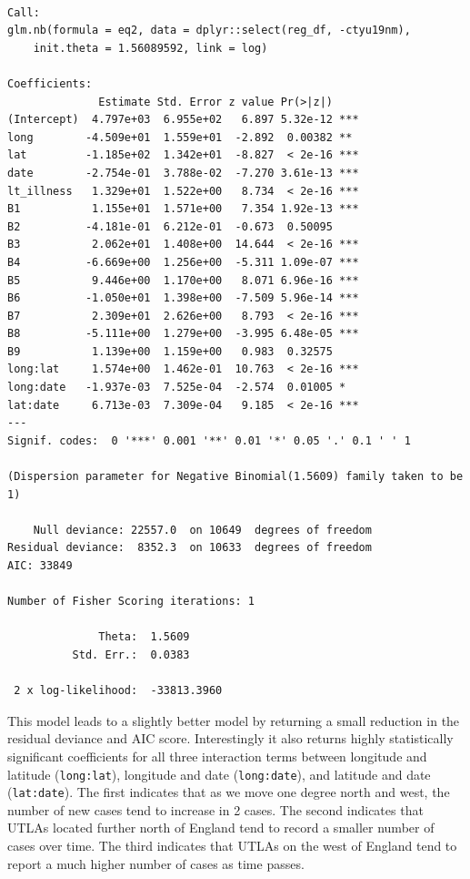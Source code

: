 \documentclass[
  letterpaper,
  DIV=11,
  numbers=noendperiod,
  oneside]{scrreprt}
\begin{document}
\begin{verbatim}

Call:
glm.nb(formula = eq2, data = dplyr::select(reg_df, -ctyu19nm), 
    init.theta = 1.56089592, link = log)

Coefficients:
              Estimate Std. Error z value Pr(>|z|)    
(Intercept)  4.797e+03  6.955e+02   6.897 5.32e-12 ***
long        -4.509e+01  1.559e+01  -2.892  0.00382 ** 
lat         -1.185e+02  1.342e+01  -8.827  < 2e-16 ***
date        -2.754e-01  3.788e-02  -7.270 3.61e-13 ***
lt_illness   1.329e+01  1.522e+00   8.734  < 2e-16 ***
B1           1.155e+01  1.571e+00   7.354 1.92e-13 ***
B2          -4.181e-01  6.212e-01  -0.673  0.50095    
B3           2.062e+01  1.408e+00  14.644  < 2e-16 ***
B4          -6.669e+00  1.256e+00  -5.311 1.09e-07 ***
B5           9.446e+00  1.170e+00   8.071 6.96e-16 ***
B6          -1.050e+01  1.398e+00  -7.509 5.96e-14 ***
B7           2.309e+01  2.626e+00   8.793  < 2e-16 ***
B8          -5.111e+00  1.279e+00  -3.995 6.48e-05 ***
B9           1.139e+00  1.159e+00   0.983  0.32575    
long:lat     1.574e+00  1.462e-01  10.763  < 2e-16 ***
long:date   -1.937e-03  7.525e-04  -2.574  0.01005 *  
lat:date     6.713e-03  7.309e-04   9.185  < 2e-16 ***
---
Signif. codes:  0 '***' 0.001 '**' 0.01 '*' 0.05 '.' 0.1 ' ' 1

(Dispersion parameter for Negative Binomial(1.5609) family taken to be 1)

    Null deviance: 22557.0  on 10649  degrees of freedom
Residual deviance:  8352.3  on 10633  degrees of freedom
AIC: 33849

Number of Fisher Scoring iterations: 1

              Theta:  1.5609 
          Std. Err.:  0.0383 

 2 x log-likelihood:  -33813.3960 
\end{verbatim}

This model leads to a slightly better model by returning a small
reduction in the residual deviance and AIC score. Interestingly it also
returns highly statistically significant coefficients for all three
interaction terms between longitude and latitude (\texttt{long:lat}),
longitude and date (\texttt{long:date}), and latitude and date
(\texttt{lat:date}). The first indicates that as we move one degree
north and west, the number of new cases tend to increase in 2 cases. The
second indicates that UTLAs located further north of England tend to
record a smaller number of cases over time. The third indicates that
UTLAs on the west of England tend to report a much higher number of
cases as time passes.
\end{document}
